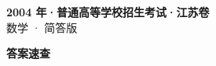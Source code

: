 \documentclass[zihao=-4, a4paper]{ctexart}
\begin{document}
\begin{center}
  {\Large\bfseries 2004 年·普通高等学校招生考试·江苏卷}\\[4pt]
  {\large 数学 · 简答版}
\end{center}
\medskip
{}

\clearpage
{}
\begin{center}{\Large\bfseries 答案速查}\end{center}
\medskip

\end{document}
